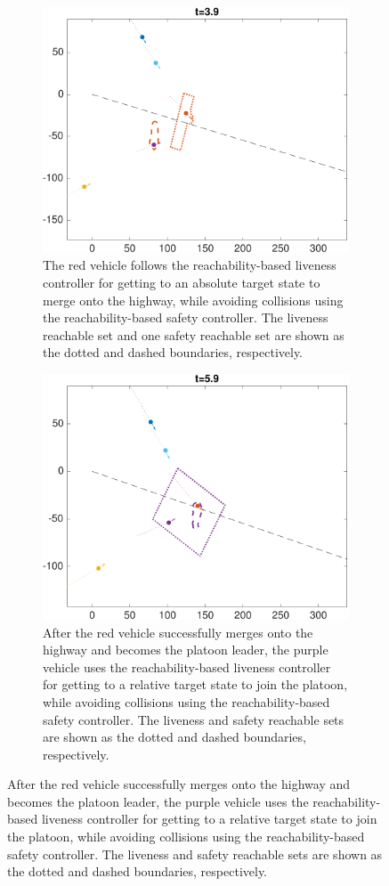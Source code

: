 \begin{figure} 
    \centering
    \begin{subfigure}[t]{0.23\textwidth} \label{subfig:fp_40}
        \includegraphics[width=\textwidth]{fig/fp_40}
        \caption{The red vehicle follows the reachability-based liveness controller for getting to an absolute target state to merge onto the highway, while avoiding collisions using the reachability-based safety controller. The liveness reachable set and one safety reachable set are shown as the dotted and dashed boundaries, respectively.}
    \end{subfigure}
    \begin{subfigure}[t]{0.23\textwidth} \label{subfig:fp_60}
        \includegraphics[width=\textwidth]{fig/fp_60}
        \caption{After the red vehicle successfully merges onto the highway and becomes the platoon leader, the purple vehicle uses the reachability-based liveness controller for getting to a relative target state to join the platoon, while avoiding collisions using the reachability-based safety controller. The liveness and safety reachable sets are shown as the dotted and dashed boundaries, respectively.}
    \end{subfigure}


\end{figure}

